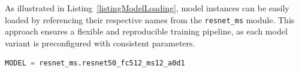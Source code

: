 As illustrated in Listing~\ref{listingModelLoading}, model instances can be easily loaded by referencing their respective names from the \texttt{resnet\_ms} module. This approach ensures a flexible and reproducible training pipeline, as each model variant is preconfigured with consistent parameters.

\begin{lstlisting}[language=Python, caption={Model loading from predefined configurations}, label=listingModelLoading]
	MODEL = resnet_ms.resnet50_fc512_ms12_a0d1
\end{lstlisting}




